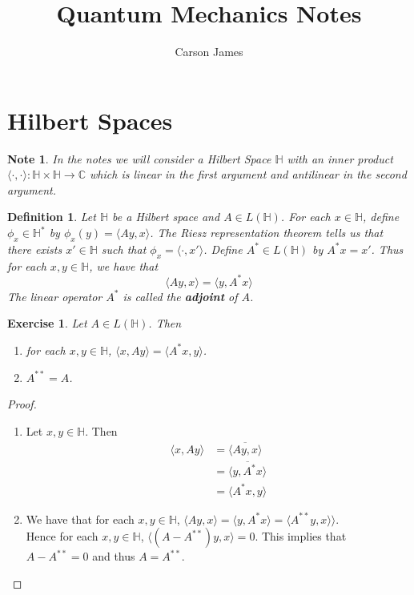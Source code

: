 \documentclass[12pt]{amsart}
\newtheorem{defn}[thm]{Definition}
\newtheorem{note}[thm]{Note}
\newtheorem{ex}[thm]{Exercise}
\renewcommand{\r}{\rangle}
\renewcommand{\l}{\langle}
\newcommand{\C}{\mathbb{C}}
\renewcommand{\H}{\mathbb{H}}
\begin{document}
\title{Quantum Mechanics Notes}
\author[James]{Carson James}
\maketitle


\tableofcontents

\section{Hilbert Spaces}

\begin{note}
In the notes we will consider a Hilbert Space $\H$ with an inner product $\langle \cdot , \cdot \rangle: \H \times \H \rightarrow \C$ which is linear in the first argument and antilinear in the second argument.
\end{note}

\begin{defn}
Let $\H$ be a Hilbert space and $A \in L(\H)$. For each $x \in \H$, define $\phi_x \in \H^*$ by $\phi_x(y) = \l Ay, x\r$. The Riesz representation theorem tells us that there exists $x' \in \H$ such that $\phi_x = \l \cdot, x' \r$. Define $A^* \in L(\H)$ by $A^*x = x'$. Thus for each $x, y \in \H$, we have that $$\l Ay, x\r = \l y, A^*x \r$$ The linear operator $A^*$ is called the \textbf{adjoint} of $A$.
\end{defn}

\begin{ex}
Let $A \in L(\H)$. Then 
\begin{enumerate}
\item for each $x,y \in \H$, $\l x, Ay\r = \l A^*x, y \r$.
\item $A^{**} = A$. 

\end{enumerate}
\end{ex}

\begin{proof} \
\begin{enumerate}
\item Let $x,y \in \H$. Then 
\begin{align*}
\l x, Ay \r 
&= \overline{\l Ay, x \r}\\
&= \overline{\l y, A^*x\r}\\
&= \l A^*x, y \r
\end{align*}
\item We have that for each $x, y \in \H$, $\l Ay, x\r = \l y, A^*x \r = \l A^{**}y, x\r  \r$. \\Hence for each $x, y \in \H$, $\l (A-A^{**})y, x \r = 0$. This implies that $A-A^{**}= 0$ and thus $A = A^{**}$.
\end{enumerate}
\end{proof}
\end{document}
